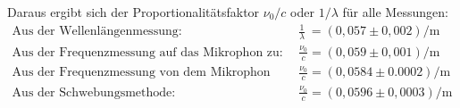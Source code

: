 \FloatBarrier
Daraus ergibt sich der Proportionalitätsfaktor $\nu_0/c$ oder $1/\lambda$ für alle Messungen:
\begin{align}
   \text{Aus der Wellenlängenmessung:} \ &
   \frac{1}{\lambda} \ =(0,057\pm0,002)\si{\per\meter}\\
   \text{Aus der Frequenzmessung auf das Mikrophon zu:} \ &
   \frac{\nu_0}{c}=(0,059\pm0,001)\si{\per\meter}\\
\text{Aus der Frequenzmessung von dem Mikrophon weg:} \ &
\frac{\nu_0}{c}=(0,0584\pm0.0002)\si{\per\meter}\\
\text{Aus der Schwebungsmethode:} \ &
\frac{\nu_0}{c}=(0,0596\pm0,0003)\si{\per\meter}
\end{align}
